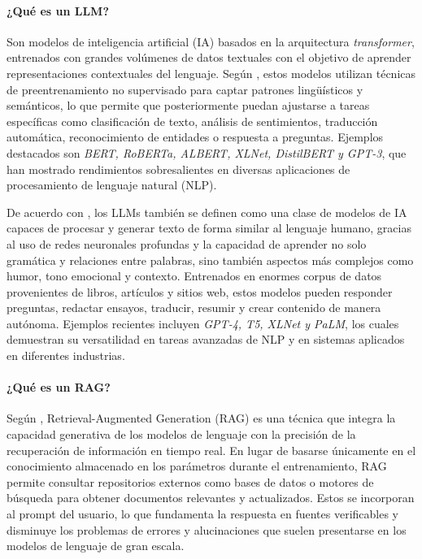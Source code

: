 \paragraph{¿Qué es un LLM?}
Son modelos de inteligencia artificial (IA) basados en la arquitectura \textit{transformer}, entrenados con grandes volúmenes de datos textuales con el objetivo de aprender representaciones
contextuales del lenguaje. Según \textcite{casola2022pretrained}, estos modelos utilizan técnicas de preentrenamiento no supervisado para captar patrones lingüísticos y semánticos,
lo que permite que posteriormente puedan ajustarse a tareas específicas como clasificación de texto, análisis de sentimientos, traducción automática, reconocimiento de entidades
o respuesta a preguntas. Ejemplos destacados son \textit{BERT, RoBERTa, ALBERT, XLNet, DistilBERT y GPT-3}, que han mostrado rendimientos sobresalientes en diversas aplicaciones de procesamiento de lenguaje natural (NLP).

De acuerdo con \textcite{ramdurai2025llm}, los LLMs también se definen como una clase de modelos de IA capaces de procesar y generar texto de forma similar al lenguaje humano,
gracias al uso de redes neuronales profundas y la capacidad de aprender no solo gramática y relaciones entre palabras, sino también aspectos más complejos como humor, 
tono emocional y contexto. Entrenados en enormes corpus de datos provenientes de libros, artículos y sitios web, estos modelos pueden responder preguntas, redactar ensayos,
traducir, resumir y crear contenido de manera autónoma. Ejemplos recientes incluyen \textit{GPT-4, T5, XLNet y PaLM}, los cuales demuestran su versatilidad en tareas avanzadas
de NLP y en sistemas aplicados en diferentes industrias. 

\paragraph{¿Qué es un RAG?}
Según \textcite{han2024rag}, Retrieval-Augmented Generation (RAG) es una técnica que integra la capacidad generativa de los modelos 
de lenguaje con la precisión de la recuperación de información en tiempo real. En lugar de basarse únicamente en el conocimiento almacenado en
los parámetros durante el entrenamiento, RAG permite consultar repositorios externos como bases de datos o motores de búsqueda para obtener
documentos relevantes y actualizados. Estos se incorporan al prompt del usuario, lo que fundamenta la respuesta en fuentes 
verificables y disminuye los problemas de errores y alucinaciones que suelen presentarse en los modelos de lenguaje de gran escala. 

